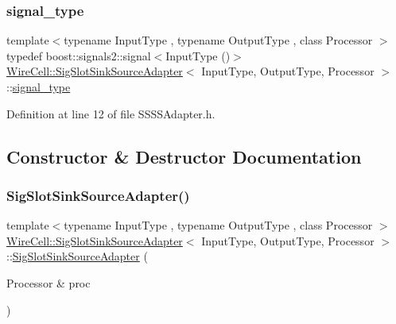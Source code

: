 \subsubsection{\texorpdfstring{signal\+\_\+type}{signal\_type}}
{\footnotesize\ttfamily template$<$typename Input\+Type , typename Output\+Type , class Processor $>$ \\
typedef boost\+::signals2\+::signal$<$Input\+Type ()$>$ \hyperlink{class_wire_cell_1_1_sig_slot_sink_source_adapter}{Wire\+Cell\+::\+Sig\+Slot\+Sink\+Source\+Adapter}$<$ Input\+Type, Output\+Type, Processor $>$\+::\hyperlink{class_wire_cell_1_1_sig_slot_sink_source_adapter_a40ff5e7ed8db807246a7f1c77ee46a58}{signal\+\_\+type}}



Definition at line 12 of file S\+S\+S\+S\+Adapter.\+h.



\subsection{Constructor \& Destructor Documentation}
\mbox{\label{class_wire_cell_1_1_sig_slot_sink_source_adapter_a9a6e0e1a49b753d56dbf1a8417b661c9}} 
\subsubsection{\texorpdfstring{Sig\+Slot\+Sink\+Source\+Adapter()}{SigSlotSinkSourceAdapter()}}
{\footnotesize\ttfamily template$<$typename Input\+Type , typename Output\+Type , class Processor $>$ \\
\hyperlink{class_wire_cell_1_1_sig_slot_sink_source_adapter}{Wire\+Cell\+::\+Sig\+Slot\+Sink\+Source\+Adapter}$<$ Input\+Type, Output\+Type, Processor $>$\+::\hyperlink{class_wire_cell_1_1_sig_slot_sink_source_adapter}{Sig\+Slot\+Sink\+Source\+Adapter} (\begin{DoxyParamCaption}\item[{Processor \&}]{proc }\end{DoxyParamCaption})\hspace{0.3cm}{\ttfamily [inline]}}




